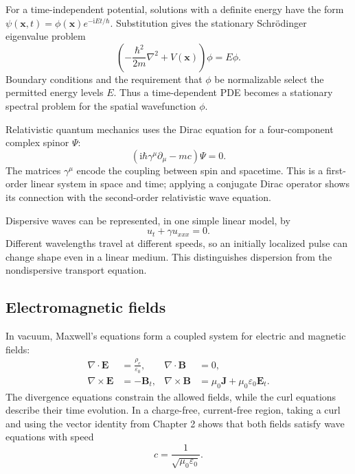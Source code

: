 For a time-independent potential, solutions with a definite energy have the form $\psi(\mathbf{x},t)=\phi(\mathbf{x})e^{-\mathrm{i}Et/\hbar}$. Substitution gives the stationary Schr\"odinger eigenvalue problem
\begin{equation}
\left(-\frac{\hbar^2}{2m}\nabla^2+V(\mathbf{x})\right)\phi=E\phi.
\end{equation}
Boundary conditions and the requirement that $\phi$ be normalizable select the permitted energy levels $E$. Thus a time-dependent PDE becomes a stationary spectral problem for the spatial wavefunction $\phi$.

Relativistic quantum mechanics uses the Dirac equation for a four-component complex spinor $\Psi$:
\begin{equation}
\left(\mathrm{i}\hbar\gamma^\mu\partial_\mu-mc\right)\Psi=0.
\end{equation}
The matrices $\gamma^\mu$ encode the coupling between spin and spacetime. This is a first-order linear system in space and time; applying a conjugate Dirac operator shows its connection with the second-order relativistic wave equation.

Dispersive waves can be represented, in one simple linear model, by
\begin{equation}
u_t+\gamma u_{xxx}=0.
\end{equation}
Different wavelengths travel at different speeds, so an initially localized pulse can change shape even in a linear medium. This distinguishes dispersion from the nondispersive transport equation.

\subsection{Electromagnetic fields}

In vacuum, Maxwell's equations form a coupled system for electric and magnetic fields:
\begin{align}
\nabla\cdot\mathbf{E}&=\frac{\rho_e}{\varepsilon_0},
&\nabla\cdot\mathbf{B}&=0,\\
\nabla\times\mathbf{E}&=-\mathbf{B}_t,
&\nabla\times\mathbf{B}&=\mu_0\mathbf{J}+\mu_0\varepsilon_0\mathbf{E}_t.
\end{align}
The divergence equations constrain the allowed fields, while the curl equations describe their time evolution. In a charge-free, current-free region, taking a curl and using the vector identity from Chapter 2 shows that both fields satisfy wave equations with speed
\begin{equation}
c=\frac{1}{\sqrt{\mu_0\varepsilon_0}}.
\end{equation}

